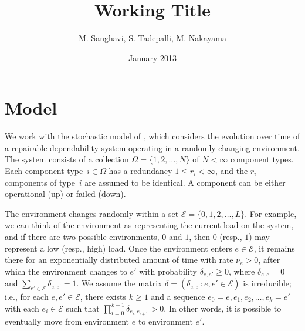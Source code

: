 \documentclass[12pt]{article}
\author{M. Sanghavi, S. Tadepalli, M. Nakayama}
\date{January 2013}
\begin{document}
\title{Working Title}
\maketitle



\section{Model}
\label{sec:model}

We work with the stochastic model
of \cite{ING:2009}, which considers
the evolution over time
of a repairable dependability system
operating in a randomly changing environment.
The system consists of
a collection
$\Omega = \{ 1, 2, \ldots, N \}$
of $N < \infty$ component types.
Each component type~$i \in \Omega$
has a redundancy $1 \leq r_i < \infty$,
and the $r_i$ components of type~$i$
are assumed to be identical.
A component can be either
operational (up) or failed (down).

The environment changes randomly
within a set
$\mathcal{E} = \{ 0, 1, 2, \ldots, L \}$.
For example, we can think of the environment
as representing the current load on the system,
and if there are two possible environments,
$0$ and $1$, then $0$ (resp., $1$)
may represent a low (resp., high) load.
Once the environment enters $e \in \mathcal{E}$,
it remains there for an exponentially distributed
amount of time with rate $\nu_e > 0$,
after which the environment changes
to $e'$ with probability $\delta_{e,e'}
\geq 0$,
where $\delta_{e,e} = 0$
and $\sum_{e' \in \mathcal{E}} \delta_{e,e'} = 1$.
We assume the matrix $\delta = (\delta_{e,e'} :
e, e' \in \mathcal{E})$ is irreducible;
i.e.,
for each $e, e' \in \mathcal{E}$,
there exists $k \geq 1$ and a sequence
$e_0 = e, e_1, e_2, \ldots, e_k = e'$
with each $e_i \in \mathcal{E}$ such that
$\prod_{i=0}^{k-1} \delta_{e_i, e_{i+1}} > 0$.
In other words, it is possible to eventually
move from environment $e$ to
environment $e'$.
\end{document}
